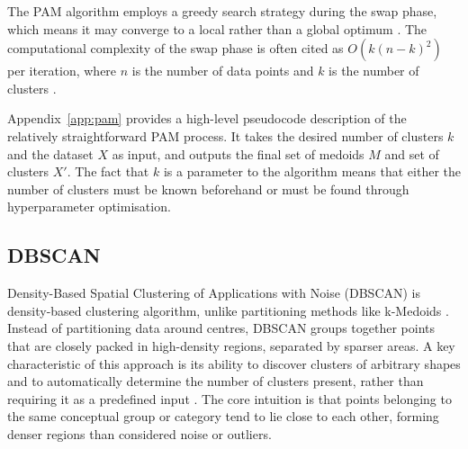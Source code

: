 \documentclass[10pt,oneside]{report}
\begin{document}
The PAM algorithm employs a greedy search strategy during the swap phase, which means it may converge to a local rather than a global optimum \cite{kmedoids}. The computational complexity of the swap phase is often cited as $O(k(n - k)^2)$ per iteration, where $n$ is the number of data points and $k$ is the number of clusters \cite{kmedoids}.

Appendix~\ref{app:pam} provides a high-level pseudocode description of the relatively straightforward PAM process. It takes the desired number of clusters $k$ and the dataset $X$ as input, and outputs the final set of medoids $M$ and set of clusters $X'$. The fact that $k$ is a parameter to the algorithm means that either the number of clusters must be known beforehand or must be found through hyperparameter optimisation.



\subsection{DBSCAN} \label{sec:dbscan}

Density-Based Spatial Clustering of Applications with Noise (DBSCAN) is density-based clustering algorithm, unlike partitioning methods like k-Medoids \cite{ester1996density}. Instead of partitioning data around centres, DBSCAN groups together points that are closely packed in high-density regions, separated by sparser areas. A key characteristic of this approach is its ability to discover clusters of arbitrary shapes and to automatically determine the number of clusters present, rather than requiring it as a predefined input \cite{ester1996density}. The core intuition is that points belonging to the same conceptual group or category tend to lie close to each other, forming denser regions than considered noise or outliers.
\end{document}
